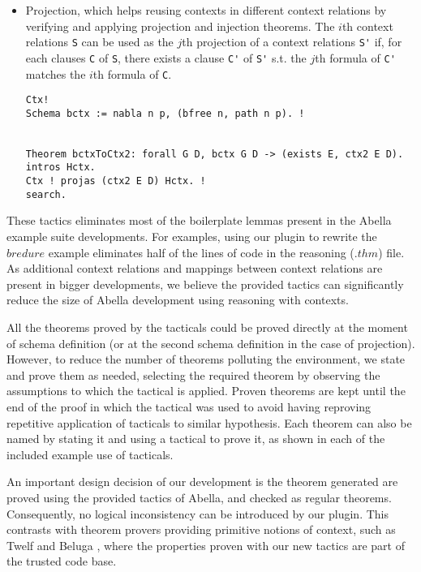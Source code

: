 \documentclass[nocopyrightspace,authoryear]{sigplanconf}
\begin{document}
\begin{itemize}
\item Projection, which helps reusing contexts in different context relations by verifying and applying projection and injection theorems. The $i$th context relations \lstinline|S| can be used as the $j$th projection of a context relations \lstinline|S'| if, for each clauses \lstinline|C| of \lstinline|S|, there exists a clause \lstinline|C'| of \lstinline|S'| s.t. the $j$th formula of \lstinline|C'| matches the $i$th formula of \lstinline|C|.
\begin{lstlisting}
Ctx!
Schema bctx := nabla n p, (bfree n, path n p). !


Theorem bctxToCtx2: forall G D, bctx G D -> (exists E, ctx2 E D).
intros Hctx. 
Ctx ! projas (ctx2 E D) Hctx. ! 
search.
\end{lstlisting}


\end{itemize}
These tactics eliminates most of the boilerplate lemmas present in the Abella example suite developments. For examples, using our plugin to rewrite the $bredure$ example eliminates half of the lines of code in the reasoning ($.thm$) file. As additional context relations and mappings between context relations are present in bigger developments, we believe the provided tactics can significantly reduce the size of Abella development using reasoning with contexts.

All the theorems proved by the tacticals could be proved directly at the moment of schema definition (or at the second schema definition in the case of projection). However, to reduce the number of theorems polluting the environment, we state and prove them as needed, selecting the required theorem by observing the assumptions to which the tactical is applied. Proven theorems are kept until the end of the proof in which the tactical was used to avoid having reproving repetitive application of tacticals to similar hypothesis. Each theorem can also be named by stating it and using a tactical to prove it, as shown in each of the included example use of tacticals.

An important design decision of our development is the theorem generated are proved using the provided tactics of Abella, and checked as regular theorems. Consequently, no logical inconsistency can be introduced by our plugin. This contrasts with theorem provers providing primitive notions of context, such as Twelf \cite{twelfsys} and Beluga \cite{belugasys}, where the properties proven with our new tactics are part of the trusted code base.
\end{document}
